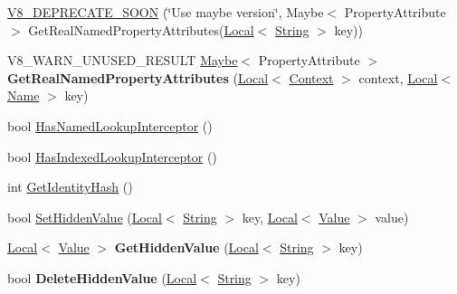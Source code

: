 \begin{DoxyCompactItemize}
\item 
\hyperlink{classv8_1_1Object_a9bc9b05ff7a9a8ad4e1977524b79da6f}{V8\+\_\+\+D\+E\+P\+R\+E\+C\+A\+T\+E\+\_\+\+S\+O\+O\+N} (\char`\"{}Use maybe version\char`\"{}, Maybe$<$ Property\+Attribute $>$ Get\+Real\+Named\+Property\+Attributes(\hyperlink{classv8_1_1Local}{Local}$<$ \hyperlink{classv8_1_1String}{String} $>$ key))
\item 
\hypertarget{classv8_1_1Object_a476c21f05ffc519252fad0ab46de33d7}{}V8\+\_\+\+W\+A\+R\+N\+\_\+\+U\+N\+U\+S\+E\+D\+\_\+\+R\+E\+S\+U\+L\+T \hyperlink{classv8_1_1Maybe}{Maybe}$<$ Property\+Attribute $>$ {\bfseries Get\+Real\+Named\+Property\+Attributes} (\hyperlink{classv8_1_1Local}{Local}$<$ \hyperlink{classv8_1_1Context}{Context} $>$ context, \hyperlink{classv8_1_1Local}{Local}$<$ \hyperlink{classv8_1_1Name}{Name} $>$ key)\label{classv8_1_1Object_a476c21f05ffc519252fad0ab46de33d7}

\item 
bool \hyperlink{classv8_1_1Object_a1e96fcb9ee17101c0299ec68f2cf8610}{Has\+Named\+Lookup\+Interceptor} ()
\item 
bool \hyperlink{classv8_1_1Object_a278913bcd203434870ce5184a538a9af}{Has\+Indexed\+Lookup\+Interceptor} ()
\item 
int \hyperlink{classv8_1_1Object_ac1ece41e81a499920ec3a2a3471653bc}{Get\+Identity\+Hash} ()
\item 
bool \hyperlink{classv8_1_1Object_ac27b823248165acf5284a7086dfed34b}{Set\+Hidden\+Value} (\hyperlink{classv8_1_1Local}{Local}$<$ \hyperlink{classv8_1_1String}{String} $>$ key, \hyperlink{classv8_1_1Local}{Local}$<$ \hyperlink{classv8_1_1Value}{Value} $>$ value)
\item 
\hypertarget{classv8_1_1Object_a25d3ba454809fd3b316a1bd0135e7dc4}{}\hyperlink{classv8_1_1Local}{Local}$<$ \hyperlink{classv8_1_1Value}{Value} $>$ {\bfseries Get\+Hidden\+Value} (\hyperlink{classv8_1_1Local}{Local}$<$ \hyperlink{classv8_1_1String}{String} $>$ key)\label{classv8_1_1Object_a25d3ba454809fd3b316a1bd0135e7dc4}

\item 
\hypertarget{classv8_1_1Object_a2b3d1433e7231a12c217da5c0561c4e1}{}bool {\bfseries Delete\+Hidden\+Value} (\hyperlink{classv8_1_1Local}{Local}$<$ \hyperlink{classv8_1_1String}{String} $>$ key)\label{classv8_1_1Object_a2b3d1433e7231a12c217da5c0561c4e1}


\end{DoxyCompactItemize}
